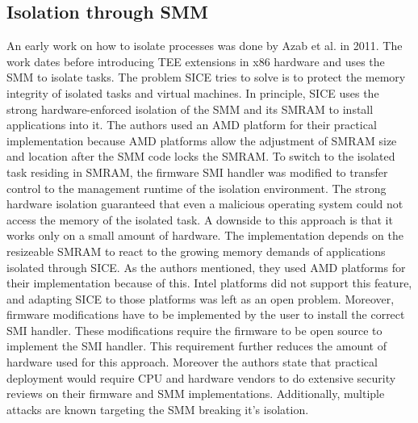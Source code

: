 \subsection{Isolation through SMM}
\label{sec:20:isolation_smm}
An early work on how to isolate processes was done by Azab et al. in
2011.\cite{azab_sice_2011} The work dates before introducing TEE extensions in
x86 hardware and uses the SMM to isolate tasks. The problem SICE tries to solve
is to protect the memory integrity of isolated tasks and virtual machines. In
principle, SICE uses the strong hardware-enforced isolation of the SMM and its
SMRAM to install applications into it. The authors used an AMD platform for
their practical implementation because AMD platforms allow the adjustment of
SMRAM size and location after the SMM code locks the SMRAM.\cite{bios2014amd} To
switch to the isolated task residing in SMRAM, the firmware SMI handler was
modified to transfer control to the management runtime of the isolation
environment. The strong hardware isolation guaranteed that even a malicious
operating system could not access the memory of the isolated task. A downside to
this approach is that it works only on a small amount of hardware. The
implementation depends on the resizeable SMRAM to react to the growing memory
demands of applications isolated through SICE. As the authors mentioned, they
used AMD platforms for their implementation because of this. Intel platforms did
not support this feature, and adapting SICE to those platforms was left as an
open problem. Moreover, firmware modifications have to be implemented by the
user to install the correct SMI handler. These modifications require the
firmware to be open source to implement the SMI handler. This requirement
further reduces the amount of hardware used for this approach. Moreover the
authors state that practical deployment would require CPU and hardware vendors
to do extensive security reviews on their firmware and SMM implementations.
Additionally, multiple attacks are known targeting the SMM breaking it's
isolation.\cite{wojtczuk2014attacking, wojtczuk2009attacking,
    wojtczuk2009poisining}

